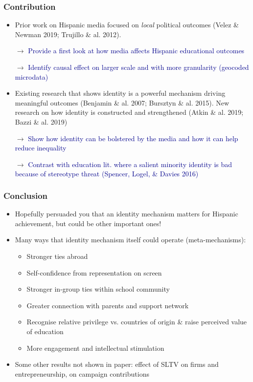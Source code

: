 \documentclass{beamer}
\begin{document}
\begin{frame}
\frametitle{Contribution}
\begin{itemize}

\item Prior work on Hispanic media focused on \textit{local} political outcomes {\footnotesize (Velez \& Newman 2019; Trujillo \& al. 2012)}. 

\item[$\rightarrow $] \textcolor{darkblue}{Provide a first look at how media affects Hispanic educational outcomes}

\item[$\rightarrow $] \textcolor{darkblue}{Identify causal effect on larger scale and with more granularity (geocoded microdata)}

\item Existing research that shows identity is a powerful mechanism driving meaningful outcomes {\footnotesize (Benjamin \& al. 2007; Bursztyn \& al. 2015)}. New research on how identity is constructed and strengthened {\footnotesize (Atkin \& al. 2019; Bazzi \& al. 2019)}

\item[$\rightarrow $] \textcolor{darkblue}{Show how identity can be bolstered by the media and how it can help reduce inequality}

\item[$\rightarrow $] \textcolor{darkblue}{Contrast with education lit. where a salient minority identity is bad because of stereotype threat {\footnotesize (Spencer, Logel, \& Davies 2016)}}

\end{itemize}

\end{frame}


\begin{frame}
\frametitle{Conclusion}
\begin{itemize}
\item Hopefully persuaded you that an identity mechanism matters for Hispanic achievement, but could be other important ones!
\item Many ways that identity mechanism itself could operate (meta-mechanisms): 
\begin{itemize}
\footnotesize
\item Stronger ties abroad
\item Self-confidence from representation on screen
\item Stronger in-group ties within school community
\item Greater connection with parents and support network
\item Recognise relative privilege vs. countries of origin \& raise perceived value of education
\item More engagement and intellectual stimulation 
\end{itemize}

\item Some other results not shown in paper: effect of SLTV on firms and entrepreneurship, on campaign contributions
\end{itemize}
\end{frame}
\end{document}
